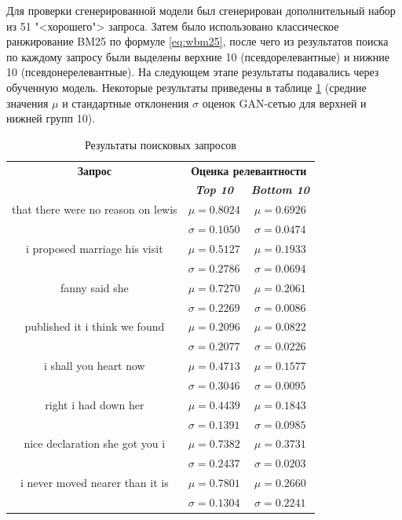 Для проверки сгенерированной модели был сгенерирован дополнительный набор из 51 "<хорошего"> запроса. Затем 
было использовано классическое ранжирование BM25 по формуле \eqref{eq:wbm25}, после чего из результатов поиска 
по каждому запросу были выделены верхние 10 (псевдорелевантные) и нижние 10 (псевдонерелевантные).
На следующем этапе результаты подавались через обученную модель. Некоторые результаты приведены в таблице \ref{tab1}
(средние значения $\mu$ и стандартные отклонения $\sigma$ оценок GAN-сетью для верхней и нижней групп 10).

\begin{table}[tbp]
    \caption{Результаты поисковых запросов}
    \begin{center}
    \begin{tabular}{ccc}
    \toprule
    \textbf{Запрос}&\multicolumn{2}{c}{\textbf{Оценка релевантности}} \\
    & \textbf{\textit{Top 10}}& \textbf{\textit{Bottom 10}} \\
    \midrule
    that there were no reason on lewis& \(\mu=0.8024\) & \(\mu=0.6926\) \\
    & \(\sigma=0.1050\) & \(\sigma=0.0474\) \\
    \midrule
    i proposed marriage his visit& \(\mu=0.5127\) & \(\mu=0.1933\) \\
    & \(\sigma=0.2786\) & \(\sigma=0.0694\) \\
    \midrule
    fanny  said she& \(\mu=0.7270\) & \(\mu=0.2061\) \\
    & \(\sigma=0.2269\) & \(\sigma=0.0086\) \\
    \midrule
    published it  i think we found& \(\mu=0.2096\) & \(\mu=0.0822\) \\
    & \(\sigma=0.2077\) & \(\sigma=0.0226\) \\
    \midrule
    i shall you heart now & \(\mu=0.4713\) & \(\mu=0.1577\) \\
    & \(\sigma=0.3046\) & \(\sigma=0.0095\) \\
    \midrule
    right i had down her & \(\mu=0.4439\) & \(\mu=0.1843\) \\
    & \(\sigma=0.1391\) & \(\sigma=0.0985\) \\
    \midrule
    nice declaration  she got you  i & \(\mu=0.7382\) & \(\mu=0.3731\) \\
    & \(\sigma=0.2437\) & \(\sigma=0.0203\) \\
    \midrule
    i never moved nearer than it is & \(\mu=0.7801\) & \(\mu=0.2660\) \\
    & \(\sigma=0.1304\) & \(\sigma=0.2241\) \\
    \bottomrule
    \end{tabular}\label{tab1}
    \end{center}
\end{table}